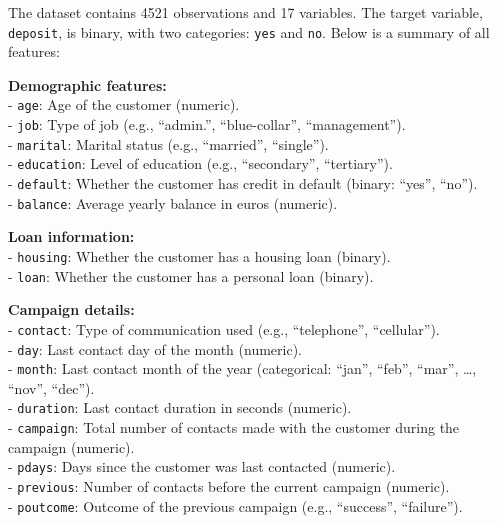 \documentclass[
  11pt,
]{book}
\newcommand{\passthrough}[1]{#1}
\theoremstyle{definition}
\theoremstyle{definition}
\theoremstyle{definition}
\theoremstyle{definition}
\theoremstyle{remark}
\begin{document}
The dataset contains 4521 observations and 17 variables. The target variable, \passthrough{\lstinline!deposit!}, is binary, with two categories: \passthrough{\lstinline!yes!} and \passthrough{\lstinline!no!}. Below is a summary of all features:

\textbf{Demographic features:}\\
- \passthrough{\lstinline!age!}: Age of the customer (numeric).\\
- \passthrough{\lstinline!job!}: Type of job (e.g., ``admin.'', ``blue-collar'', ``management'').\\
- \passthrough{\lstinline!marital!}: Marital status (e.g., ``married'', ``single'').\\
- \passthrough{\lstinline!education!}: Level of education (e.g., ``secondary'', ``tertiary'').\\
- \passthrough{\lstinline!default!}: Whether the customer has credit in default (binary: ``yes'', ``no'').\\
- \passthrough{\lstinline!balance!}: Average yearly balance in euros (numeric).

\textbf{Loan information:}\\
- \passthrough{\lstinline!housing!}: Whether the customer has a housing loan (binary).\\
- \passthrough{\lstinline!loan!}: Whether the customer has a personal loan (binary).

\textbf{Campaign details:}\\
- \passthrough{\lstinline!contact!}: Type of communication used (e.g., ``telephone'', ``cellular'').\\
- \passthrough{\lstinline!day!}: Last contact day of the month (numeric).\\
- \passthrough{\lstinline!month!}: Last contact month of the year (categorical: ``jan'', ``feb'', ``mar'', \ldots, ``nov'', ``dec'').\\
- \passthrough{\lstinline!duration!}: Last contact duration in seconds (numeric).\\
- \passthrough{\lstinline!campaign!}: Total number of contacts made with the customer during the campaign (numeric).\\
- \passthrough{\lstinline!pdays!}: Days since the customer was last contacted (numeric).\\
- \passthrough{\lstinline!previous!}: Number of contacts before the current campaign (numeric).\\
- \passthrough{\lstinline!poutcome!}: Outcome of the previous campaign (e.g., ``success'', ``failure'').
\end{document}
